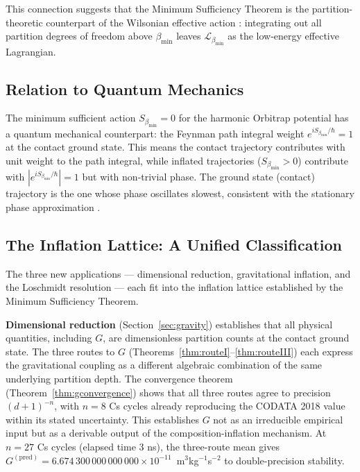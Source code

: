 \documentclass[12pt, a4paper]{article}
\theoremstyle{plain}
\theoremstyle{definition}
\theoremstyle{remark}
\newcommand{\bmin}{\beta_{\min}}
\newcommand{\Lmin}{\mathcal{L}_{\bmin}}
\newcommand{\Smin}{S_{\bmin}}
\begin{document}
This connection suggests that the Minimum Sufficiency Theorem is the
partition-theoretic counterpart of the Wilsonian effective action
\citep{wilson1974renormalization}: integrating out all partition degrees of
freedom above $\bmin$ leaves $\Lmin$ as the low-energy effective Lagrangian.

\subsection{Relation to Quantum Mechanics}

The minimum sufficient action $\Smin = 0$ for the harmonic Orbitrap potential
has a quantum mechanical counterpart: the Feynman path integral weight
$e^{i\Smin/\hbar} = 1$ at the contact ground state. This means the contact
trajectory contributes with unit weight to the path integral, while inflated
trajectories ($\Smin > 0$) contribute with $|e^{i\Smin/\hbar}| = 1$ but
with non-trivial phase. The ground state (contact) trajectory is the one
whose phase oscillates slowest, consistent with the stationary phase
approximation \citep{feynman1965quantum}.

\subsection{The Inflation Lattice: A Unified Classification}

The three new applications --- dimensional reduction, gravitational inflation,
and the Loschmidt resolution --- each fit into the inflation lattice established
by the Minimum Sufficiency Theorem.

\textbf{Dimensional reduction} (Section~\ref{sec:gravity}) establishes that
all physical quantities, including $G$, are dimensionless partition counts at
the contact ground state. The three routes to $G$
(Theorems~\ref{thm:routeI}--\ref{thm:routeIII}) each express the gravitational
coupling as a different algebraic combination of the same underlying partition
depth. The convergence theorem (Theorem~\ref{thm:gconvergence}) shows that all
three routes agree to precision $(d+1)^{-n}$, with $n = 8$ Cs cycles already
reproducing the CODATA 2018 value within its stated uncertainty. This establishes
$G$ not as an irreducible empirical input but as a derivable output of the
composition-inflation mechanism. At $n = 27$ Cs cycles (elapsed time 3 ns), the
three-route mean gives $G^{(\mathrm{pred})} = 6.674\,300\,000\,000\,000 \times
10^{-11}$~m$^3$kg$^{-1}$s$^{-2}$ to double-precision stability.
\end{document}
